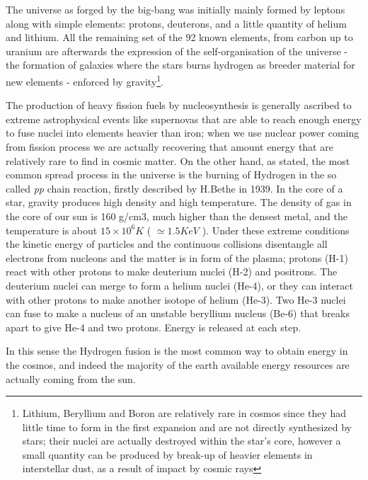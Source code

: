 The universe as forged by the big-bang was initially mainly formed by leptons along with simple elements: protons, deuterons, and a little quantity of helium and lithium. All the remaining set of the 92 known elements, from carbon up to uranium are afterwards the expression of the self-organisation of the universe - the formation of galaxies where the stars burns hydrogen as breeder material for new elements - enforced by gravity\footnote{ Lithium, Beryllium and Boron are relatively rare in cosmos since they had little time to form in the first expansion and are not directly synthesized by stars; their nuclei are actually destroyed within the star's core, however a small quantity can be produced by break-up of heavier elements in interstellar dust, as a result of impact by cosmic rays\cite{LiBeB_syntesis}}.

The production of heavy fission fuels by nucleosynthesis is generally ascribed to extreme astrophysical events like supernovas that are able to reach enough energy to fuse nuclei into elements heavier than iron; when we use nuclear power coming from fission process we are actually recovering that amount energy that are relatively rare to find in cosmic matter. 
% 
On the other hand, as stated, the most common spread process in the universe is the burning of Hydrogen in the so called \textit{pp} chain reaction, firstly described by H.Bethe in 1939. 
In the core of a star, gravity produces high density and high temperature. The density of gas in the core of our sun is 160 g/cm3, much higher than the densest metal, and the temperature is about $15\times10^6K$ ( $\simeq 1.5 KeV$ ). Under these extreme conditions the kinetic energy of particles and the continuous collisions disentangle all electrons from nucleons and the matter is in form of the plasma; protons (H-1) react with other protons to make deuterium nuclei (H-2) and positrons. The deuterium nuclei can merge to form a helium nuclei (He-4), or they can interact with other protons to make another isotope of helium (He-3). Two He-3 nuclei can fuse to make a nucleus of an unstable beryllium nucleus (Be-6) that breaks apart to give He-4 and two protons. Energy is released at each step.

In this sense the Hydrogen fusion is the most common way to obtain energy in the cosmos, and indeed the majority of the earth available energy resources are actually coming from the sun.

